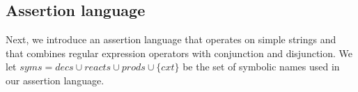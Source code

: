 \subsection{Assertion language}

%
%
%

Next, we introduce an assertion language that operates on simple strings
and that combines regular expression operators with conjunction and disjunction.
We let $\mathit{syms} = \mathit{decs}\cup\mathit{reacts}\cup\mathit{prods}\cup\{\mathit{cxt}\}$ be the set of symbolic names used in our assertion language.

